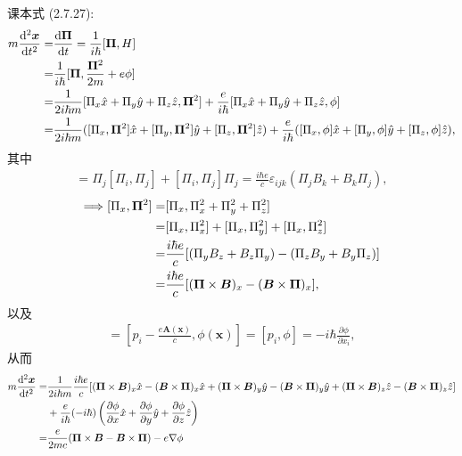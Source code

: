 \documentclass{assignment}
\begin{document}
\begin{pf}
\begin{itemize}
        课本式 (2.7.27):
        \begin{align}
            \notag m\frac{\mathrm{d}^2\bm{x}}{\mathrm{d}t^2}=&\frac{\mathrm{d}\bm{\Pi}}{\mathrm{d}t}=\frac{1}{i\hbar}[\bm{\Pi},H]\\
            \notag=&\frac{1}{i\hbar}[\bm{\Pi},\frac{\bm{\Pi}^2}{2m}+e\phi]\\
            \notag=&\frac{1}{2i\hbar m}[\Pi_x\hat{x}+\Pi_y\hat{y}+\Pi_z\hat{z},\bm{\Pi}^2]+\frac{e}{i\hbar}[\Pi_x\hat{x}+\Pi_y\hat{y}+\Pi_z\hat{z},\phi]\\
            =&\frac{1}{2i\hbar m}([\Pi_x,\bm{\Pi}^2]\hat{x}+[\Pi_y,\bm{\Pi}^2]\hat{y}+[\Pi_z,\bm{\Pi}^2]\hat{z})+\frac{e}{i\hbar}([\Pi_x,\phi]\hat{x}+[\Pi_y,\phi]\hat{y}+[\Pi_z,\phi]\hat{z}),
        \end{align}
        其中
        \begin{align}
            [\Pi_i,\Pi_j^2]=\Pi_j[\Pi_i,\Pi_j]+[\Pi_i,\Pi_j]\Pi_j=\frac{i\hbar e}{c}\varepsilon_{ijk}(\Pi_jB_k+B_k\Pi_j),
        \end{align}
        \begin{align}
            \notag\Longrightarrow[\Pi_x,\bm{\Pi}^2]=&[\Pi_x,\Pi_x^2+\Pi_y^2+\Pi_z^2]\\
            \notag=&[\Pi_x,\Pi_x^2]+[\Pi_x,\Pi_y^2]+[\Pi_x,\Pi_z^2]\\
            \notag=&\frac{i\hbar e}{c}[(\Pi_yB_z+B_z\Pi_y)-(\Pi_zB_y+B_y\Pi_z)]\\
            =&\frac{i\hbar e}{c}[(\bm{\Pi}\times\bm{B})_x-(\bm{B}\times\bm{\Pi})_x],
        \end{align}
        以及
        \begin{align}
            [\Pi_i,\phi]=[p_i-\frac{e\bm{A}(\bm{x})}{c},\phi(\bm{x})]=[p_i,\phi]=-i\hbar\frac{\partial\phi}{\partial x_i},
        \end{align}
        从而
        \begin{align}
            \notag m\frac{\mathrm{d}^2\bm{x}}{\mathrm{d}t^2}=&\frac{1}{2i\hbar m}\frac{i\hbar e}{c}[(\bm{\Pi}\times\bm{B})_x\hat{x}-(\bm{B}\times\bm{\Pi})_x\hat{x}+(\bm{\Pi}\times\bm{B})_y\hat{y}-(\bm{B}\times\bm{\Pi})_y\hat{y}+(\bm{\Pi}\times\bm{B})_z\hat{z}-(\bm{B}\times\bm{\Pi})_z\hat{z}]\\
            \notag&+\frac{e}{i\hbar}(-i\hbar)\left(\frac{\partial\phi}{\partial x}\hat{x}+\frac{\partial\phi}{\partial y}\hat{y}+\frac{\partial\phi}{\partial z}\hat{z}\right)\\
            \notag=&\frac{e}{2mc}(\bm{\Pi}\times\bm{B}-\bm{B}\times\bm{\Pi})-e\nabla\phi\\

\end{align}
\end{itemize}
\end{pf}
\end{document}
